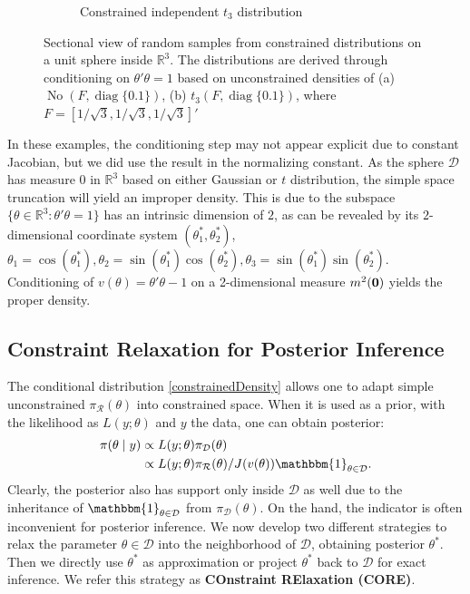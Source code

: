 \documentclass[10pt,fleqn]{article}
\newcommand{\be}{\begin{equation}\begin{aligned}}
\newcommand{\ee}{\end{aligned}\end{equation}}
\newcommand{\bb}[1]{\mathbb{#1}}
\newcommand{\mc}[1]{\mathcal{#1}}
\DeclareMathOperator{\No}{No}
\DeclareMathOperator{\diag}{diag}
\DeclareMathOperator{\1}{\mathbbm{1}}
\begin{document}
\begin{figure}[H]
\begin{subfigure}[b]{0.45\textwidth}
\caption{Constrained independent $t_3$ distribution}
\end{subfigure}
\caption{Sectional view of random samples from constrained distributions on a unit sphere inside $\bb R^3$. The distributions are derived through conditioning on $\theta'\theta=1$ based on unconstrained densities of (a) $\No( F, \diag\{0.1\})$, 
 (b) $t_3(F,\diag\{0.1\} )$, where $F=[1/\sqrt{3},1/\sqrt{3},1/\sqrt{3}]'$\\
}
\label{sphere_examples}
\end{figure}

In these examples,  the conditioning step may not appear explicit due to
constant Jacobian,
 but we did use the result in the normalizing constant. As the sphere $\mc D$ has measure $0$ in $\bb R^3$
based on either Gaussian or $t$ distribution, the simple space truncation will
yield an improper density. This is due to the subspace $\{\theta\in \bb R^3:\theta'\theta=1\}$ has an intrinsic dimension of $2$, as can be revealed by its $2$-dimensional
coordinate system $(\theta^*_1,\theta^*_2)$, $\theta_1=\cos(\theta^*_1), \theta_2=\sin(\theta^*_1)\cos(\theta^*_2), \theta_3=\sin(\theta^*_1)\sin(\theta^*_2)$. 
Conditioning of $v(\theta)=\theta'\theta-1$
on a 2-dimensional measure $m^2(\bf 0)$ yields the proper density. 

\subsection{ Constraint Relaxation for Posterior Inference}

The conditional distribution \eqref{constrainedDensity} allows one to adapt
simple unconstrained $\pi_{\mc R}(\theta)$ into constrained space. When it
is used as a prior,
with  the likelihood as $ L(y;\theta)$  and $y$ the data, one can obtain posterior:
\be
\label{exactPosterior}
\pi(\theta\mid y) & \propto L(y;\theta)\pi_{\mc D}(\theta) \\
& \propto L(y;\theta) \pi_{\mc
R}(\theta) /J(v(\theta))\mathbbm{1}_{\theta\in \mc D}.
\ee
Clearly, the
posterior also has support only inside $\mc D$ as well due to the inheritance of
$\mathbbm{1}_{\theta\in \mc D}$ from $\pi_{\mc D}(\theta)$. On the hand,
the indicator is often inconvenient for posterior inference. We now develop
 two different strategies to relax the parameter $\theta\in \mc D$ into the neighborhood
of $\mc D$, obtaining posterior $\theta^*$. Then we directly use $\theta^*$ as approximation
or project $\theta^*$ back to $\mc D$ for exact inference. We refer this
strategy as {\bf COnstraint RElaxation (CORE)}.
\end{document}

